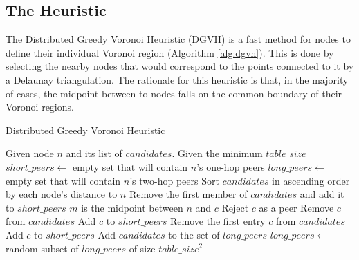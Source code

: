 \documentclass[11pt, conference, letterpaper]{IEEEtran}
\begin{document}
\subsection{The Heuristic}




The Distributed Greedy Voronoi Heuristic (DGVH) is a fast method for nodes to define their individual Voronoi region (Algorithm \ref{alg:dgvh}). 
This is done by selecting the nearby nodes that would correspond to the points connected to it by a Delaunay triangulation.
The rationale for this heuristic is that, in the majority of cases, the midpoint between to nodes falls on the common boundary of their Voronoi regions.




\begin{algorithm} %
\caption{Distributed Greedy Voronoi Heuristic}
\label{alg:dgvh}
\begin{algorithmic}[1]  %
	 \STATE Given node $n$ and its list of $candidates$.
   	 \STATE Given the minimum $table\_size$
    \STATE $short\_peers \leftarrow$ empty set that will contain $n$'s one-hop peers
	 \STATE $long\_peers \leftarrow$ empty set that will contain $n$'s two-hop peers    
    \STATE Sort $candidates$ in ascending order by each node's distance to $n$
    \STATE Remove the first member of $candidates$ and add it to $short\_peers$
    	\STATE $m$ is the midpoint between $n$ and $c$
        	\STATE Reject $c$ as a peer
        \ELSE
        	\STATE Remove $c$ from $candidates$
        	\STATE Add $c$ to $short\_peers$
        \ENDIF
    \ENDFOR
    	\STATE Remove the first entry $c$ from $candidates$
    	\STATE Add $c$ to $short\_peers$
    \ENDWHILE
    	\STATE Add $candidates$ to the set of $long\_peers$	
        		\STATE $long\_peers \leftarrow$ random subset of $long\_peers$ of size $table\_size^2$
      \ENDIF
\end{algorithmic}
\end{algorithm}
\end{document}
